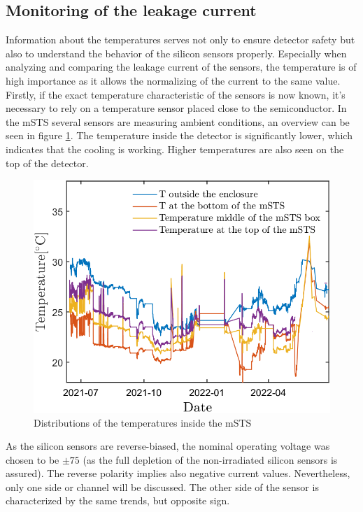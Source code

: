 \subsection{Monitoring of the leakage current}

Information about the temperatures serves not only to ensure detector safety but also to understand the behavior of the silicon sensors properly. Especially when analyzing and comparing the leakage current of the sensors, the temperature is of high importance as it allows the normalizing of the current to the same value. Firstly, if the exact temperature characteristic of the sensors is now known, it's necessary to rely on a temperature sensor placed close to the semiconductor. In the \gls{mSTS} several sensors are measuring ambient conditions, an overview can be seen in figure \ref{fig_temperatures}. The temperature inside the detector is significantly lower, which indicates that the cooling is working. Higher temperatures are also seen on the top of the detector. 

\newpage
\begin{figure}[!h]
\centering
\includegraphics[width=0.55\columnwidth]{Chapter5/DCS/images/rates/tempmSTS.png}
\caption{Distributions of the temperatures inside the \gls{mSTS}}
\label{fig_temperatures}
\end{figure}

As the silicon sensors are reverse-biased, the nominal operating voltage was chosen to be $\pm75$ (as the full depletion of the non-irradiated silicon sensors is assured). The reverse polarity implies also negative current values. Nevertheless, only one side or channel will be discussed. The other side of the sensor is characterized by the same trends, but opposite sign.


